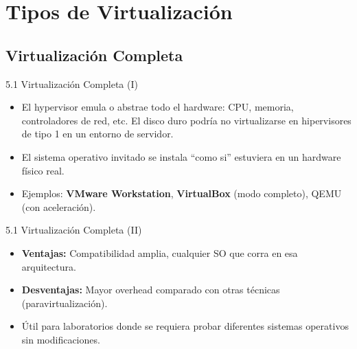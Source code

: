 \documentclass{beamer}
\begin{document}
\section{Tipos de Virtualización}

\subsection{Virtualización Completa}
\begin{frame}{5.1 Virtualización Completa (I)}
    \begin{itemize}
        \item El hypervisor emula o abstrae todo el hardware: CPU, memoria, controladores de red, etc. 
            \subitem El disco duro podría no virtualizarse en hipervisores de tipo 1 en un entorno de servidor.
        \item El sistema operativo invitado se instala “como si” estuviera en un hardware físico real.
        \item Ejemplos: \textbf{VMware Workstation}, \textbf{VirtualBox} (modo completo), QEMU (con aceleración).
    \end{itemize}
\end{frame}

\begin{frame}{5.1 Virtualización Completa (II)}
    \begin{itemize}
        \item \textbf{Ventajas:} Compatibilidad amplia, cualquier SO que corra en esa arquitectura.
        \item \textbf{Desventajas:} Mayor overhead comparado con otras técnicas (paravirtualización).
        \item Útil para laboratorios donde se requiera probar diferentes sistemas operativos sin modificaciones.
    \end{itemize}
\end{frame}

\end{document}
